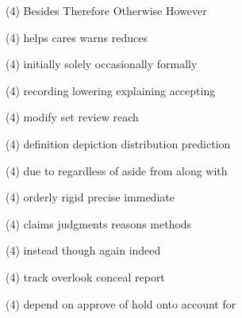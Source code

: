 \item
\begin{tasks}(4)
	\task Besides
	\task Therefore
	\task Otherwise
	\task However
\end{tasks}
\item
\begin{tasks}(4)
	\task helps
	\task cares
	\task warns
	\task reduces
\end{tasks}
\item
\begin{tasks}(4)
	\task initially
	\task solely
	\task occasionally
	\task formally
\end{tasks}
\item
\begin{tasks}(4)
	\task recording
	\task lowering
	\task explaining
	\task accepting
\end{tasks}
\item
\begin{tasks}(4)
	\task modify
	\task set
	\task review
	\task reach
\end{tasks}
\item
\begin{tasks}(4)
	\task definition
	\task depiction
	\task distribution
	\task prediction
\end{tasks}
\item
\begin{tasks}(4)
	\task due to
	\task regardless of
	\task aside from
	\task along with
\end{tasks}
\item
\begin{tasks}(4)
	\task orderly
	\task rigid
	\task precise
	\task immediate
\end{tasks}
\item
\begin{tasks}(4)
	\task claims
	\task judgments
	\task reasons
	\task methods
\end{tasks}
\item
\begin{tasks}(4)
	\task instead
	\task though
	\task again
	\task indeed
\end{tasks}
\item
\begin{tasks}(4)
	\task track
	\task overlook
	\task conceal
	\task report
\end{tasks}
\item
\begin{tasks}(4)
	\task depend on
	\task approve of
	\task hold onto
	\task account for
\end{tasks}
